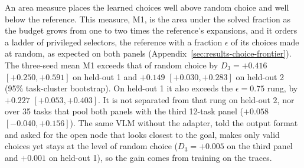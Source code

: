 An area measure places the learned choices well above random choice and well below the reference. This measure, M1, is the area under the solved fraction as the budget grows from one to two times the reference's expansions, and it orders a ladder of privileged selectors, the reference with a fraction $\epsilon$ of its choices made at random, as expected on both panels (Appendix~\ref{sec:results-choice-frontier}). The three-seed mean M1 exceeds that of random choice by $D_3=+0.416$ $[+0.250, +0.591]$ on held-out 1 and $+0.149$ $[+0.030, +0.283]$ on held-out 2 (95\% task-cluster bootstrap). On held-out 1 it also exceeds the $\epsilon=0.75$ rung, by $+0.227$ $[+0.053, +0.403]$. It is not separated from that rung on held-out 2, nor over 35 tasks that pool both panels with the third 12-task panel ($+0.058$ $[-0.040, +0.156]$). The same VLM without the adapter, told the output format and asked for the open node that looks closest to the goal, makes only valid choices yet stays at the level of random choice ($D_3=+0.005$ on the third panel and $+0.001$ on held-out 1), so the gain comes from training on the traces.

